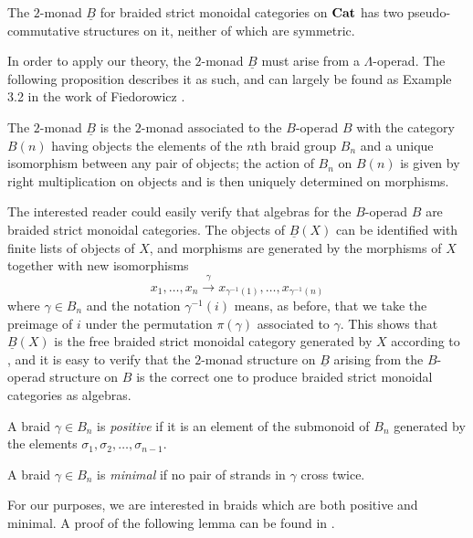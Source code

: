 \begin{thm}\label{braidpscomm}
The $2$-monad $\underline{B}$ for braided strict monoidal categories on $\mathbf{Cat}$ has two pseudo-commutative structures on it, neither of which are symmetric.
\end{thm}

In order to apply our theory, the $2$-monad $\underline{B}$ must arise from a $\Lambda$-operad. The following proposition describes it as such, and can largely be found as Example 3.2 in the work of Fiedorowicz \cite{fie-br}.

\begin{prop}
The $2$-monad $\underline{B}$ is the $2$-monad associated to the $B$-operad $B$ with the category $B(n)$ having objects the elements of the $n$th braid group $B_{n}$ and a unique isomorphism between any pair of objects; the action of $B_{n}$ on $B(n)$ is given by right multiplication on objects and is then uniquely determined on morphisms.
\end{prop}

The interested reader could easily verify that algebras for the $B$-operad $B$ are braided strict monoidal categories. The objects of $\underline{B}(X)$ can be identified with finite lists of objects of $X$, and morphisms are generated by the morphisms of $X$ together with new isomorphisms
  \[
    x_{1}, \ldots, x_{n} \stackrel{\gamma}{\longrightarrow} x_{\gamma^{-1}(1)}, \ldots, x_{\gamma^{-1}(n)}
  \]
where $\gamma \in B_{n}$ and the notation $\gamma^{-1}(i)$ means, as before, that we take the preimage of $i$ under the permutation $\pi(\gamma)$ associated to $\gamma$. This shows that $\underline{B}(X)$ is the free braided strict monoidal category generated by $X$ according to \cite{js}, and it is easy to verify that the $2$-monad structure on $\underline{B}$ arising from the $B$-operad structure on $B$ is the correct one to produce braided strict monoidal categories as algebras.

\begin{Defi}
A braid $\gamma \in B_{n}$ is \textit{positive} if it is an element of the submonoid of $B_{n}$ generated by the elements $\sigma_{1}, \sigma_{2}, \ldots, \sigma_{n-1}$.
\end{Defi}

\begin{Defi}
 A braid $\gamma \in B_{n}$ is \textit{minimal} if no pair of strands in $\gamma$ cross twice.
\end{Defi}

For our purposes, we are interested in braids which are both positive and minimal. A proof of the following lemma can be found in \cite{EM2}.

